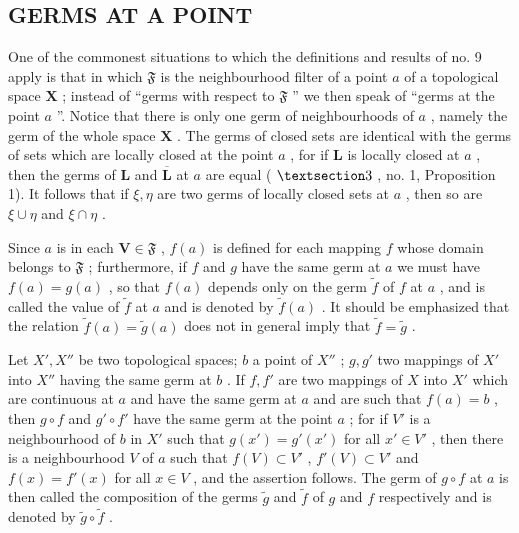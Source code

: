 \subsection{GERMS AT A POINT}

One of the commonest situations to which the definitions and results of no. 9 apply is that in which \(\mathfrak{F}\) is the neighbourhood filter of a point \(a\) of a topological space \(\mathbf{X}\) ; instead of ``germs with respect to \(\mathfrak{F}\) '' we then speak of ``germs at the point \(a\) ''. Notice that there is only one germ of neighbourhoods of \(a\) , namely the germ of the whole space \(\mathbf{X}\) . The germs of closed sets are identical with the germs of sets which are locally closed at the point \(a\) , for if \(\mathbf{L}\) is locally closed at \(a\) , then the germs of \(\mathbf{L}\) and \(\overline{\mathbf{L}}\) at \(a\) are equal ( \(\S 3\) , no. 1, Proposition 1). It follows that if \(\xi, \eta\) are two germs of locally closed sets at \(a\) , then so are \(\xi \cup \eta\) and \(\xi \cap \eta\) .

Since \(a\) is in each \(\mathbf{V} \in \mathfrak{F}\) , \(f(a)\) is defined for each mapping \(f\) whose domain belongs to \(\mathfrak{F}\) ; furthermore, if \(f\) and \(g\) have the same germ at \(a\) we must have \(f(a) = g(a)\) , so that \(f(a)\) depends only on the germ \(\tilde{f}\) of \(f\) at \(a\) , and is called the value of \(\tilde{f}\) at \(a\) and is denoted by \(\tilde{f}(a)\) . It should be emphasized that the relation \(\tilde{f}(a) = \tilde{g}(a)\) does not in general imply that \(\tilde{f} = \tilde{g}\) .

Let \(X', X''\) be two topological spaces; \(b\) a point of \(X''\) ; \(g, g'\) two mappings of \(X'\) into \(X''\) having the same germ at \(b\) . If \(f, f'\) are two mappings of \(X\) into \(X'\) which are continuous at \(a\) and have the same germ at \(a\) and are such that \(f(a) = b\) , then \(g \circ f\) and \(g' \circ f'\) have the same germ at the point \(a\) ; for if \(V'\) is a neighbourhood of \(b\) in \(X'\) such that \(g(x') = g'(x')\) for all \(x' \in V'\) , then there is a neighbourhood \(V\) of \(a\) such that \(f(V) \subset V'\) , \(f'(V) \subset V'\) and \(f(x) = f'(x)\) for all \(x \in V\) , and the assertion follows. The germ of \(g \circ f\) at \(a\) is then called the composition of the germs \(\tilde{g}\) and \(\tilde{f}\) of \(g\) and \(f\) respectively and is denoted by \(\tilde{g} \circ \tilde{f}\) .

